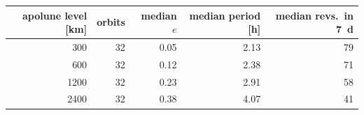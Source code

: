 \begin{tabular}{@{}r r r r r@{}}
\toprule
apolune level [km] & orbits & median $e$ & median period [h] & median revs.\ in 7~d \\
\midrule
    300 & 32 & 0.05 & 2.13 & 79 \\
    600 & 32 & 0.12 & 2.38 & 71 \\
    1200 & 32 & 0.23 & 2.91 & 58 \\
    2400 & 32 & 0.38 & 4.07 & 41 \\
\bottomrule
\end{tabular}
